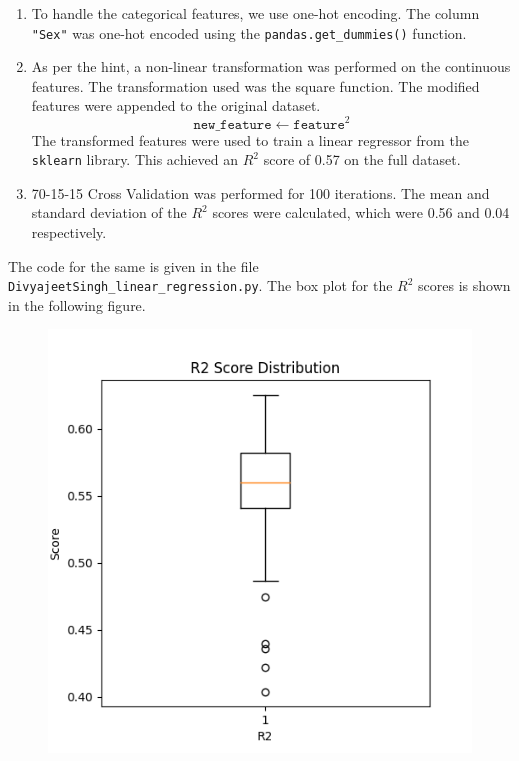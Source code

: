 \documentclass[12pt]{article}
\begin{document}
    \begin{enumerate}[label=(\alph*)]
        \item To handle the categorical features, we use one-hot encoding. The column \texttt{"Sex"}
        was one-hot encoded using the \texttt{pandas.get\_dummies()} function.
        \item As per the hint, a non-linear transformation was performed on the continuous features.
        The transformation used was the square function. The modified features were appended
        to the original dataset.
        \begin{equation}
            \texttt{new\_feature} \gets \texttt{feature}^{2}
        \end{equation}
        The transformed features were used to train a linear regressor from the \texttt{sklearn}
        library. This achieved an $R^{2}$ score of 0.57 on the full dataset.
        \item 70-15-15 Cross Validation was performed for 100 iterations. The mean and standard
        deviation of the $R^{2}$ scores were calculated, which were 0.56 and 0.04 respectively.
    \end{enumerate}
    The code for the same is given in the file \texttt{DivyajeetSingh\_linear\_regression.py}.
    The box plot for the $R^{2}$ scores is shown in the following figure.

    \begin{figure}[htbp]
        \centering
        \includegraphics[width=\textwidth]{Assets/r2.png}
    \end{figure}
\end{document}
